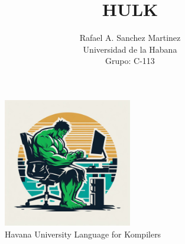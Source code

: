 \documentclass{article}
\title{HULK}
\author{Rafael A. Sanchez Martinez \\ Universidad de la Habana \\ Grupo: C-113}
\date{}
\begin{document}
\maketitle

\begin{figure}[h]
    \centering
    \includegraphics[width=0.5\textwidth]{assets/hulk_logo.jpeg}
    \caption{Havana University Language for Kompilers}
\end{figure}

\newpage

\newpage

\newpage

\newpage

\newpage

\newpage
\end{document}

